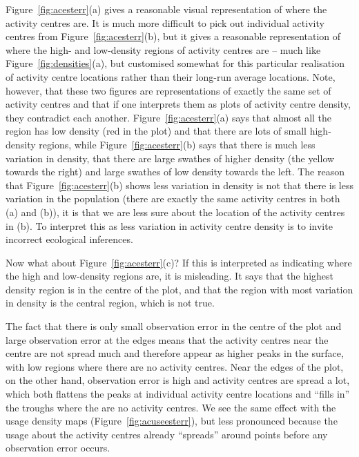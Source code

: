 \documentclass[10pt,a4paper]{article}
\begin{document}
Figure~\ref{fig:acesterr}(a) gives a reasonable visual representation of where the activity centres are. It is much more difficult to pick out individual activity centres from Figure~\ref{fig:acesterr}(b), but it gives a reasonable representation of where the high- and low-density regions of activity centres are -- much like Figure~\ref{fig:densities}(a), but customised somewhat for this particular realisation of activity centre locations rather than their long-run average locations. Note, however, that these two figures are representations of exactly the same set of activity centres and that if one interprets them as plots of activity centre density, they contradict each another. Figure~\ref{fig:acesterr}(a) says that almost all the region has low density (red in the plot) and that there are lots of small high-density regions, while Figure~\ref{fig:acesterr}(b) says that there is much less variation in density, that there are large swathes of higher density (the yellow towards the right) and large swathes of low density towards the left. The reason that Figure~\ref{fig:acesterr}(b) shows less variation in density is not that there is less variation in the population (there are exactly the same activity centres in both (a) and (b)), it is that we are less sure about the location of the activity centres in (b). To interpret this as less variation in activity centre density is to invite incorrect ecological inferences.

Now what about Figure~\ref{fig:acesterr}(c)? If this is interpreted as indicating where the high and low-density regions are, it is misleading. It says that the highest density region is in the centre of the plot, and that the region with most variation in density is the central region, which is not true. 

The fact that there is only small observation error in the centre of the plot and large observation error at the edges means that the activity centres near the centre are not spread much and therefore appear as higher peaks in the surface, with low regions where there are no activity centres. Near the edges of the plot, on the other hand, observation error is high and activity centres are spread a lot, which both flattens the peaks at individual activity centre locations and ``fills in'' the troughs where the are no activity centres. We see the same effect with the usage density maps (Figure~\ref{fig:acuseesterr}), but less pronounced because the usage about the activity centres already ``spreads'' around points before any observation error occurs.
\end{document}
